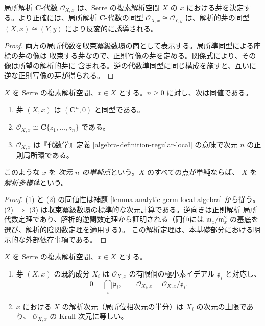 \begin{lemma}
\label{lemma-analytic-germ-local-algebra}
\begin{reference}
\cite[\S 1、第4項、6頁]{GAGA}
\end{reference}
局所解析 $\mathbf C$-代数 $\mathcal O_{X,x}$ は、Serre の複素解析空間 $X$ の
$x$ における芽を決定する。より正確には、局所解析 $\mathbf C$-代数の同型
$\mathcal O_{X,x}\cong\mathcal O_{Y,y}$ は、解析的芽の同型
$(X,x)\cong(Y,y)$ により反変的に誘導される。
\end{lemma}

\begin{proof}
両方の局所代数を収束冪級数環の商として表示する。局所準同型による座標の芽の像は
収束する芽なので、正則写像の芽を定める。関係式により、その像は所望の解析的芽に
含まれる。逆の代数準同型に同じ構成を施すと、互いに逆な正則写像の芽が得られる。
\end{proof}

\begin{lemma}
\label{lemma-simple-point-regular-local}
\begin{reference}
\cite[\S 1、第4項、6頁]{GAGA}
\end{reference}
$X$ を Serre の複素解析空間、$x\in X$ とする。$n\geq 0$ に対し、次は同値である。
\begin{enumerate}
\item 芽 $(X,x)$ は $(\mathbf C^n,0)$ と同型である。
\item $\mathcal O_{X,x}\cong\mathbf C\{z_1,\ldots,z_n\}$ である。
\item $\mathcal O_{X,x}$ は『代数学』定義
\ref{algebra-definition-regular-local} の意味で次元 $n$ の正則局所環である。
\end{enumerate}
このような $x$ を {\it 次元 $n$ の単純点}という。$X$ のすべての点が単純ならば、
$X$ を {\it 解析多様体}という。
\end{lemma}

\begin{proof}
(1) と (2) の同値性は補題 \ref{lemma-analytic-germ-local-algebra} から従う。
(2) $\Rightarrow$ (3) は収束冪級数環の標準的な次元計算である。逆向きは正則解析
局所代数定理であり、解析的逆関数定理から証明される（同値には
$\mathfrak m_x/\mathfrak m_x^2$ の基底を選び、解析的陰関数定理を適用する）。
この解析定理は、本基礎部分における明示的な外部依存事項である。
\end{proof}

\begin{lemma}
\label{lemma-components-dimension-analytic-space}
\begin{reference}
\cite[\S 1、第4項、6--7頁]{GAGA}
\end{reference}
$X$ を Serre の複素解析空間、$x\in X$ とする。
\begin{enumerate}
\item 芽 $(X,x)$ の既約成分 $X_i$ は $\mathcal O_{X,x}$ の有限個の極小素イデアル
$\mathfrak p_i$ と対応し、
$$
0=\bigcap_i\mathfrak p_i,
\qquad
\mathcal O_{X_i,x}=\mathcal O_{X,x}/\mathfrak p_i.
$$
\item $x$ における $X$ の解析次元（局所位相次元の半分）は $X_i$ の次元の上限であり、
$\mathcal O_{X,x}$ の Krull 次元に等しい。
\end{enumerate}
\end{lemma}

